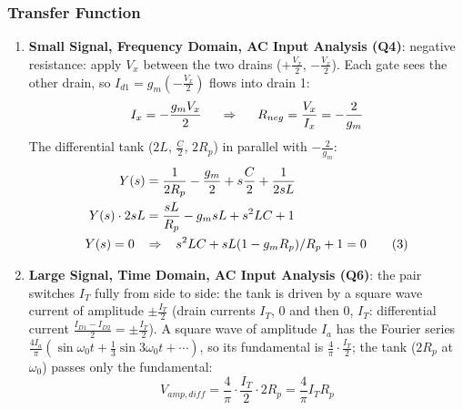 \subsubsection{Transfer Function}
\begin{enumerate}
  \item \textbf{Small Signal, Frequency Domain, AC Input Analysis (Q4)}: negative resistance: apply \(V_x\) between the two drains (\(+\frac{V_x}{2}\),
\(-\frac{V_x}{2}\)). Each gate sees the other drain, so
\(I_{d1} = g_m\left(-\frac{V_x}{2}\right)\) flows into drain 1:
\[
  I_x = -\frac{g_m V_x}{2} \hspace{0.5cm} \Rightarrow \hspace{0.5cm} R_{neg} = \frac{V_x}{I_x} = -\frac{2}{g_m}
\]
The differential tank (\(2L\), \(\frac{C}{2}\), \(2R_p\)) in parallel with
\(-\frac{2}{g_m}\):
\begin{align*}
  Y(s) &= \frac{1}{2R_p} - \frac{g_m}{2} + s\frac{C}{2} + \frac{1}{2sL} \\
  Y(s)\cdot 2sL &= \frac{sL}{R_p} - g_m sL + s^2 LC + 1 \\
  Y(s) = 0 \hspace{0.3cm} &\Rightarrow \hspace{0.3cm} s^2 LC + s L(1 - g_m R_p)/R_p + 1 = 0 \tag{3}
\end{align*}
  \item \textbf{Large Signal, Time Domain, AC Input Analysis (Q6)}: the pair switches \(I_T\) fully from
    side to side: the tank is driven by a square wave current of amplitude \(\pm\frac{I_T}{2}\) (drain currents
    \(I_T\), \(0\) and then \(0\), \(I_T\): differential current \(\frac{I_{D1} - I_{D2}}{2} = \pm\frac{I_T}{2}\)). A square wave of
    amplitude \(I_a\) has the Fourier series \(\frac{4I_a}{\pi}\left(\sin\omega_0 t + \frac{1}{3}\sin 3\omega_0 t + \cdots\right)\), so its
    fundamental is \(\frac{4}{\pi}\cdot\frac{I_T}{2}\); the tank (\(2R_p\) at \(\omega_0\)) passes only the fundamental:
\[
  V_{amp,diff} = \frac{4}{\pi}\cdot\frac{I_T}{2}\cdot 2R_p = \frac{4}{\pi} I_T R_p \tag{4}
\]
\end{enumerate}


